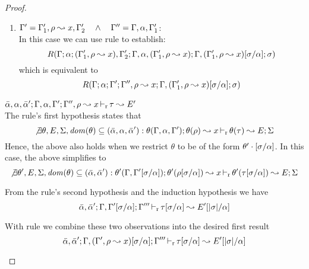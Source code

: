 \begin{proof}
\begin{description}
\begin{enumerate}
  \item $\Gamma' = \Gamma_1',\rho \leadsto x, \Gamma_2' \quad\wedge\quad \Gamma'' = \Gamma,\alpha,\Gamma_1'$: \\
  In this case we can use rule  to establish:
\begin{equation*}
  R(\Gamma;\alpha;(\Gamma_1',\rho \leadsto x),\Gamma_2';\Gamma,\alpha,(\Gamma_1',\rho \leadsto x);
  \Gamma,(\Gamma_1',\rho \leadsto x)[\sigma/\alpha];\sigma)
\end{equation*}
  which is equivalent to
\begin{equation*}
  R(\Gamma;\alpha;\Gamma';\Gamma'',\rho \leadsto x;\Gamma,(\Gamma_1',\rho \leadsto x)[\sigma/\alpha];\sigma)
\end{equation*}
  \end{enumerate}

\item[\fbox{\texttt{(L-RuleNoMatch)}}]\quad$\bar{\alpha},\alpha,\bar{\alpha}'; \Gamma,\alpha,\Gamma'; \Gamma'',\rho \leadsto x \mathop{\vdash_{\mathrm{r}}} \tau \leadsto E'$ \ \\
  The rule's first hypothesis states that
\begin{equation*}
  \not\exists \theta, E, \Sigma, \mathit{dom}(\theta) \subseteq (\bar{\alpha},\alpha,\bar{\alpha}'): \theta(\Gamma,\alpha,\Gamma'); \theta(\rho)\leadsto x \mathop{\vdash_{\mathrm{r}}} \theta(\tau)\leadsto E; \Sigma
\end{equation*}
  Hence, the above also holds when we restrict $\theta$ to be of the form
$\theta' \cdot [\sigma/\alpha]$. In this case, the above simplifies to
\begin{equation*}
  \not\exists \theta', E, \Sigma, \mathit{dom}(\theta) \subseteq (\bar{\alpha},\bar{\alpha}'): \theta'(\Gamma,\Gamma'[\sigma/\alpha]); \theta'(\rho[\sigma/\alpha])\leadsto x \mathop{\vdash_{\mathrm{r}}} \theta'(\tau[\sigma/\alpha])\leadsto E; \Sigma
\end{equation*}

  From the rule's second hypothesis and the induction hypothesis we have
\begin{equation*}
  \bar{\alpha},\bar{\alpha}';\Gamma,\Gamma'[\sigma/\alpha];\Gamma''' \mathop{\vdash_{\mathrm{r}}} \tau[\sigma/\alpha] \leadsto E'[|\sigma|/\alpha]
\end{equation*}

  With rule  we combine these two observations into the desired first result
\begin{equation*}
  \bar{\alpha},\bar{\alpha}';\Gamma,(\Gamma',\rho \leadsto x)[\sigma/\alpha];\Gamma''' \mathop{\vdash_{\mathrm{r}}} \tau[\sigma/\alpha] \leadsto E'[|\sigma|/\alpha]
\end{equation*}


\end{description}
\end{proof}
